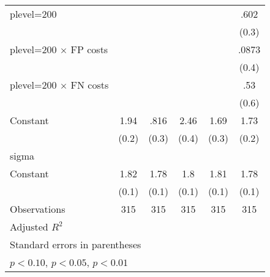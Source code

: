 \begin{table}[htbp]
\begin{tabular}{l*{5}{c}}
plevel=200      &                  &                  &                  &                  &     .602\sym{*}  \\
                &                  &                  &                  &                  &    (0.3)         \\
plevel=200 $\times$ FP costs&                  &                  &                  &                  &    .0873         \\
                &                  &                  &                  &                  &    (0.4)         \\
plevel=200 $\times$ FN costs&                  &                  &                  &                  &      .53         \\
                &                  &                  &                  &                  &    (0.6)         \\
Constant        &     1.94\sym{***}&     .816\sym{**} &     2.46\sym{***}&     1.69\sym{***}&     1.73\sym{***}\\
                &    (0.2)         &    (0.3)         &    (0.4)         &    (0.3)         &    (0.2)         \\
\hline
sigma           &                  &                  &                  &                  &                  \\
Constant        &     1.82\sym{***}&     1.78\sym{***}&      1.8\sym{***}&     1.81\sym{***}&     1.78\sym{***}\\
                &    (0.1)         &    (0.1)         &    (0.1)         &    (0.1)         &    (0.1)         \\
\hline
Observations    &      315         &      315         &      315         &      315         &      315         \\
Adjusted \(R^{2}\)&                  &                  &                  &                  &                  \\
\hline\hline
\multicolumn{6}{l}{\footnotesize Standard errors in parentheses}\\
\multicolumn{6}{l}{\footnotesize \sym{*} \(p<0.10\), \sym{**} \(p<0.05\), \sym{***} \(p<0.01\)}\\
\end{tabular}
\end{table}
